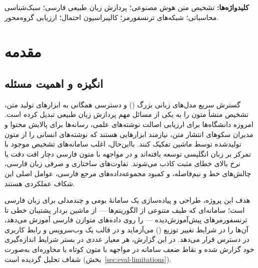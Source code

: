 \documentclass[12pt,a4paper]{report}
\DeclareRobustCommand{\en}[1]{\lr{\XeTeXinterchartokenstate=0 #1}}
\begin{document}
\vspace{4mm}
\noindent\textbf{کلیدواژه‌ها:} تشخیص متن هوش مصنوعی؛ پردازش زبان طبیعی فارسی؛ سبک‌شناسی محاسباتی؛ شبکه‌های ترنسفورمر؛ کالیبراسیون احتمال؛ ارزیابی گروه‌محور.

\clearpage
\pagestyle{plain}

\chapter{مقدمه}\label{ch:intro}

\section{انگیزه و اهمیت مسئله}\label{sec:intro-motivation}
گسترش سریع مدل‌های زبانی بزرگ (\en{LLMs}) و دسترسی همگانی به ابزارهای تولید متن، تشخیص منشأ متون را به یکی از مسائل مهم پردازش زبان طبیعی تبدیل کرده است. امروزه دانشگاه‌ها برای ارزیابی اصالت نوشته‌های علمی، رسانه‌ها برای پالایش محتوا و مدیران سکوهای انتشار متن، نیازمند ابزارهایی هستند که نوشته‌های انسانی را از متون تولیدشده توسط ماشین تفکیک کنند. بااین‌حال، اغلب سامانه‌های تشخیص موجود با تمرکز بر زبان انگلیسی توسعه یافته‌اند و در مواجهه با متون فارسی دچار افت دقت یا نرخ بالای خطای مثبت کاذب می‌شوند. تفاوت‌های ساختاری و صرفی زبان فارسی، چالش‌های خط و نیم‌فاصله، و کمبود مجموعه‌داده‌های مرجع فارسی، عوامل اصلی این شکاف عملکردی هستند.

هدف این پروژه، طراحی و پیاده‌سازی یک سامانهٔ بومی و چندمدلی برای زبان فارسی است؛ سامانه‌ای که طیف متنوعی از الگوریتم‌ها — از ماشین بردار پشتیبان خطی تا ترنسفورمرهای پیش‌آموزش‌دیده — را روی داده‌های متوازن فارسی آموزش می‌دهد، آن‌ها را در شرایط تغییر توزیع (\en{Distribution Shift}) می‌آزماید و در قالب یک وب‌سرویس و رابط کاربری در دسترس قرار می‌دهد. در این گزارش، هر معیار عددی در بستر شرایط اندازه‌گیری خود گزارش شده و نقاط ضعف سامانه در مواجهه با متون کوتاه یا محاوره‌ای به‌صورت شفاف تحلیل گردیده است (بخش~\ref{sec:eval-limitations}).
\end{document}
